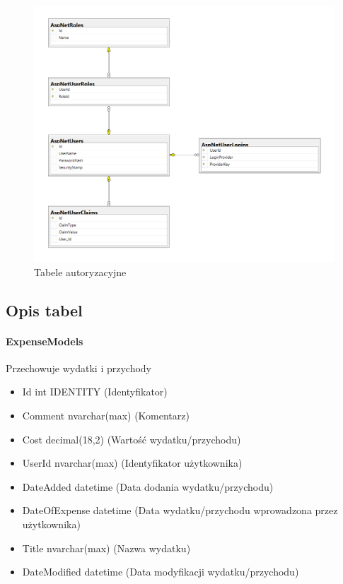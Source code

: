 \documentclass[10pt,titlepage]{article}
\begin{document}
\begin{figure}[htbp]
  \centering
  \includegraphics[scale=0.5]{images/db3.png}
  \caption{Tabele autoryzacyjne}
\end{figure}
\subsection{Opis tabel}
\paragraph[short]{ExpenseModels}
Przechowuje wydatki i przychody
\begin{itemize}
  \item Id int IDENTITY (Identyfikator)
  \item Comment nvarchar(max) (Komentarz)
  \item Cost decimal(18,2) (Wartość wydatku/przychodu)
  \item UserId nvarchar(max) (Identyfikator użytkownika)
  \item DateAdded datetime (Data dodania wydatku/przychodu)
  \item DateOfExpense datetime (Data wydatku/przychodu wprowadzona przez użytkownika)
  \item Title nvarchar(max) (Nazwa wydatku)
  \item DateModified datetime (Data modyfikacji wydatku/przychodu)
\end{itemize}
\end{document}
